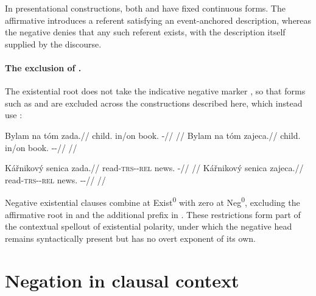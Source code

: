 In presentational constructions, both  and  have fixed
continuous forms. The affirmative introduces a referent satisfying an
event-anchored description, whereas the negative denies that any such referent
exists, with the description itself supplied by the discourse.

\paragraph{The exclusion of .} The existential root 
does not take the indicative negative marker , so that forms such as
 and  are excluded across the constructions
described here, which instead use :

\pex
\a
\begingl
\gla Bylam na tóm zada.//
\glb child.\Ind{} in/on book.\Dir{} \NegExst{}-\Cont{}//
\glft {} //
\endgl
\a
\begingl
\gla {*}Bylam na tóm zajeca.//
\glb child.\Ind{} in/on book.\Dir{} \Neg{}-\Exst{}-\Cont{}//
\glft {} //
\endgl
\xe

\pex
\a
\begingl
\gla Kářnikový senica zada.//
\glb read-\textsc{trs}-\Pf{}-\textsc{rel} news.\Dir{} \NegExst{}-\Cont{}//
\glft {} //
\endgl
\a
\begingl
\gla {*}Kářnikový senica zajeca.//
\glb read-\textsc{trs}-\Pf{}-\textsc{rel} news.\Dir{} \Neg{}-\Exst{}-\Cont{}//
\glft {} //
\endgl
\xe

Negative existential clauses combine  at Exist\textsuperscript{0}
with zero at Neg\textsuperscript{0}, excluding the affirmative root in
 and the additional prefix in . These restrictions
form part of the contextual spellout of existential polarity, under which the
negative head remains syntactically present but has no overt exponent of its
own.

\section{Negation in clausal context}\label{sec:clausal-negation}

